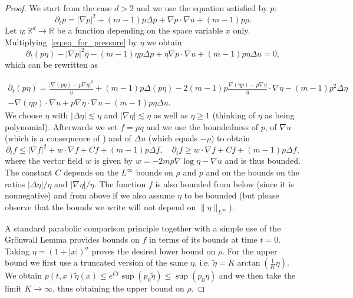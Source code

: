 \documentclass[11pt,a4paper]{article}
\numberwithin{equation}{section}
\newcommand{\R}{{\mathbb{R}}}
\theoremstyle{plain}
\theoremstyle{remark}
\begin{document}
\begin{proof}
We start from the case $d>2$ and we use the equation satisfied by $p$:
\begin{equation}\label{eq:eq_for_pressure}
\partial_t p = |\nabla p|^2 + (m-1)p\Delta p + \nabla p\cdot\nabla u + (m-1) p \rho.   
\end{equation}
Let $\eta:\R^d\to \R$ be a function depending on the space variable $x$ only. Multiplying~\eqref{eq:eq_for_pressure} by $\eta$ we obtain
\begin{equation}\label{eq:eq_of_p_eta}
\partial_t(p\eta) - |\nabla p|^2\eta - (m-1)\eta p \Delta p + \eta\nabla p \cdot\nabla u  + (m-1)p\eta\Delta u=0,
\end{equation}
which can be rewritten as

\begin{multline*}
\partial_t(p\eta) = \frac{|\nabla(p\eta)-p\nabla \eta|^2}{\eta} + (m-1)p\Delta (p\eta) - 2(m-1)p\frac{\nabla(\eta p)-p\nabla\eta}{\eta}\cdot \nabla \eta  - (m-1)p^2\Delta \eta\\
- \nabla(\eta p)\cdot\nabla u + p\nabla \eta \cdot\nabla u  -(m-1)p\eta \Delta u.
\end{multline*}
We choose $\eta$ with $|\Delta\eta|\lesssim \eta$ and $|\nabla\eta|\lesssim \eta $  as well as $\eta\geq 1$ (thinking of $\eta$ as being polynomial). Afterwards we set $f=p\eta$ and we use  the boundedness of $p$, of $\nabla u$ (which is a consequence of ) and of $\Delta u$ (which equals $-\rho$) to obtain 
$$
    \partial_t f \leq |\nabla f|^2+w\cdot \nabla f+Cf+ (m-1) p \Delta f,\quad \partial_t f \geq w\cdot \nabla f+Cf+ (m-1) p \Delta f,
$$
where the vector field $w$ is given by $w=-2mp\nabla\log\eta-\nabla u$ and is thus bounded. The constant $C$ depends on the $L^\infty$ bounds on $\rho$ and $p$ and on the bounds on the ratios $|\Delta\eta|/\eta$ and $|\nabla\eta|/\eta$. The function $f$ is also bounded from below (since it is nonnegative) and from above if we also assume $\eta$ to be bounded (but please observe that the bounds we write will not depend on $\|\eta\|_{L^\infty}$).

A standard parabolic comparison principle together with a simple use of the Gr\"onwall Lemma provides bounds on $f$ in terms of its bounds at time $t=0$. Taking $\eta=(1+|x|)^{\sigma}$ proves the desired lower bound on $\rho$. For the upper bound we first use a truncated version of the same $\eta$, i.e. $\tilde \eta=K\arctan(\frac 1K \eta)$. We obtain $p(t,x)\tilde\eta(x)\leq e^{Ct}\sup ( p_0\tilde\eta ) \leq \sup ( p_0\eta )$ and we then take the limit $K\to\infty$, thus obtaining the upper bound on $\rho$.


\end{proof}
\end{document}
